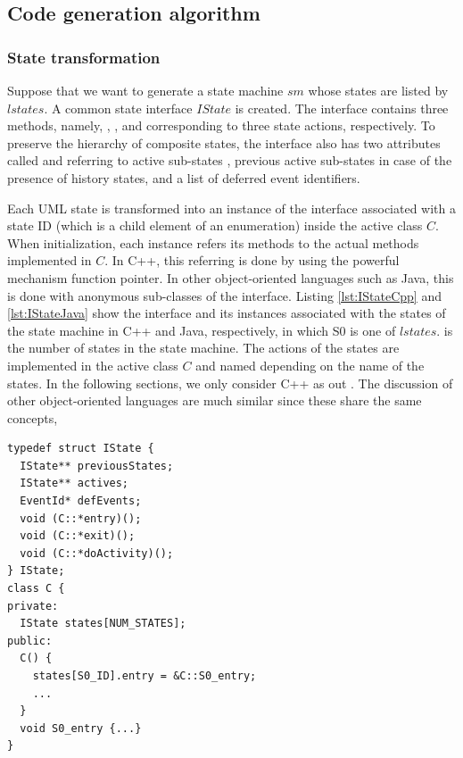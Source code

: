 \subsection{Code generation algorithm}
\subsubsection{State transformation}
Suppose that we want to generate a state machine $sm$ whose states are listed by $lstates$. A common state interface $IState$ is created. The interface contains three methods, namely, , , and  corresponding to three state actions, respectively. To preserve the hierarchy of composite states, the interface also has two attributes called  and  referring to active sub-states  , previous active sub-states  in case of the presence of history states, and a list of deferred event identifiers.

Each UML state is transformed into an instance of the interface associated with a state ID (which is a child element of an enumeration) inside the active class $C$. When initialization, each instance refers its methods to the actual methods implemented in $C$. In C++, this referring is done by using the powerful mechanism function pointer. In other object-oriented languages such as Java, this is done with anonymous sub-classes of the interface. Listing \ref{lst:IStateCpp} and \ref{lst:IStateJava} show the interface and its instances associated with the states of the state machine in C++ and Java, respectively, in which S0 is one of $lstates$.  is the number of states in the state machine. The actions of the states are implemented in the active class $C$ and named depending on the name of the states. In the following sections, we only consider C++ as out . The discussion of other object-oriented languages are much similar since these share the same concepts,  

\begin{lstlisting}[caption=IState interface and function pointers in C++, label=lst:IStateCpp, frame=single]
typedef struct IState {
  IState** previousStates; 
  IState** actives;
  EventId* defEvents;
  void (C::*entry)();
  void (C::*exit)();
  void (C::*doActivity)();
} IState;
class C {
private:
  IState states[NUM_STATES];
public:
  C() {
    states[S0_ID].entry = &C::S0_entry;
    ...
  }
  void S0_entry {...}
}
\end{lstlisting}

